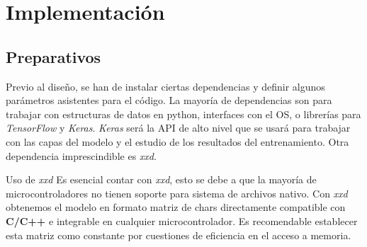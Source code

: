 \section{Implementación}
\subsection{Preparativos}
Previo al diseño, se han de instalar ciertas dependencias y definir
algunos parámetros asistentes para el código. La mayoría de dependencias
son para trabajar con estructuras de datos en python, interfaces con el OS, o
librerías para \textit{TensorFlow} y \textit{Keras}.\newline
\textit{Keras}\textsuperscript{\cite{Aurelien,keras}} será la API de alto nivel que se usará
para trabajar con las capas del modelo y el estudio de los resultados del entrenamiento.\newline
Otra dependencia imprescindible es \textit{xxd}.
\begin{teoria}{Uso de \textit{xxd}\textsuperscript{\cite{tf-xxd}}}
    \color{mitexto}
    Es esencial contar con \textit{xxd}, esto se debe a que la mayoría de
    microcontroladores no tienen soporte para sistema de archivos nativo.\newline
    Con \textit{xxd} obtenemos el modelo en formato matriz de chars directamente
    compatible con \textbf{C/C++} e integrable en cualquier microcontrolador.\newline
    Es recomendable establecer esta matriz como constante por cuestiones de
    eficiencia en el acceso a memoria.
\end{teoria}

